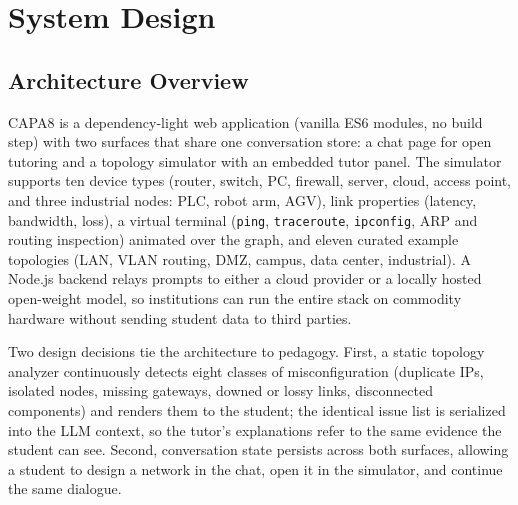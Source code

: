 \documentclass[conference,a4paper]{IEEEtran}
\begin{document}
\section{System Design}
\subsection{Architecture Overview}
CAPA8 is a dependency-light web application (vanilla ES6 modules, no build step) with two surfaces that share one conversation store: a chat page for open tutoring and a topology simulator with an embedded tutor panel. The simulator supports ten device types (router, switch, PC, firewall, server, cloud, access point, and three industrial nodes: PLC, robot arm, AGV), link properties (latency, bandwidth, loss), a virtual terminal (\texttt{ping}, \texttt{traceroute}, \texttt{ipconfig}, ARP and routing inspection) animated over the graph, and eleven curated example topologies (LAN, VLAN routing, DMZ, campus, data center, industrial). A Node.js backend relays prompts to either a cloud provider or a locally hosted open-weight model, so institutions can run the entire stack on commodity hardware without sending student data to third parties.

Two design decisions tie the architecture to pedagogy. First, a static topology analyzer continuously detects eight classes of misconfiguration (duplicate IPs, isolated nodes, missing gateways, downed or lossy links, disconnected components) and renders them to the student; the identical issue list is serialized into the LLM context, so the tutor's explanations refer to the same evidence the student can see. Second, conversation state persists across both surfaces, allowing a student to design a network in the chat, open it in the simulator, and continue the same dialogue.
\end{document}
